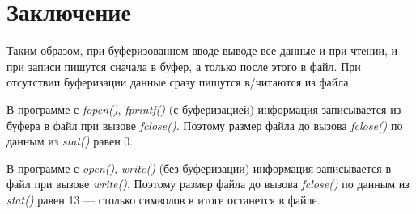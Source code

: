 \section*{Заключение}

Таким образом, при буферизованном вводе-выводе все данные и при чтении, и при записи пишутся сначала в буфер, а только после этого в файл. При отсутствии буферизации данные сразу пишутся в/читаются из файла.

В программе с \textit{fopen()}, \textit{fprintf()} (с буферизацией) информация записывается из буфера в файл при вызове \textit{fclose()}. Поэтому размер файла до вызова \textit{fclose()} по данным из \textit{stat()} равен 0.

В программе с \textit{open()}, \textit{write()} (без буферизации) информация записывается в файл при вызове \textit{write()}. Поэтому размер файла до вызова \textit{fclose()} по данным из \textit{stat()} равен 13 — столько символов в итоге останется в файле.
\newpage